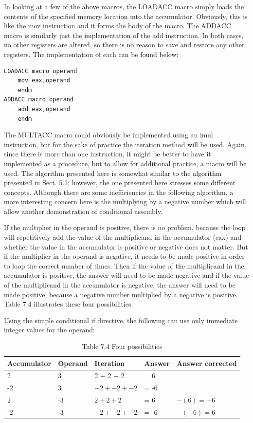 \documentclass[10pt]{article}
\begin{document}
In looking at a few of the above macros, the LOADACC macro simply loads the contents of the specified memory location into the accumulator. Obviously, this is like the mov instruction and it forms the body of the macro. The ADDACC macro is similarly just the implementation of the add instruction. In both cases, no other registers are altered, so there is no reason to save and restore any other registers. The implementation of each can be found below:

\begin{verbatim}
LOADACC macro operand
    mov eax,operand
    endm
ADDACC macro operand
    add eax,operand
    endm
\end{verbatim}

The MULTACC macro could obviously be implemented using an imul instruction, but for the sake of practice the iteration method will be used. Again, since there is more than one instruction, it might be better to have it implemented as a procedure, but to allow for additional practice, a macro will be used. The algorithm presented here is somewhat similar to the algorithm presented in Sect. 5.1; however, the one presented here stresses some different concepts. Although there are some inefficiencies in the following algorithm, a more interesting concern here is the multiplying by a negative number which will allow another demonstration of conditional assembly.

If the multiplier in the operand is positive, there is no problem, because the loop will repetitively add the value of the multiplicand in the accumulator (eax) and whether the value in the accumulator is positive or negative does not matter. But if the multiplier in the operand is negative, it needs to be made positive in order to loop the correct number of times. Then if the value of the multiplicand in the accumulator is positive, the answer will need to be made negative and if the value of the multiplicand in the accumulator is negative, the answer will need to be made positive, because a negative number multiplied by a negative is positive. Table 7.4 illustrates these four possibilities.

Using the simple conditional if directive, the following can use only immediate integer values for the operand:

\begin{table}[h]
\begin{center}
\captionsetup{labelformat=empty}
\caption{Table 7.4 Four possibilities}
\begin{tabular}{|l|l|l|l|l|}
\hline
Accumulator & Operand & Iteration & Answer & Answer corrected \\
\hline
2 & 3 & 2 + 2 + 2 & = 6 &  \\
\hline
-2 & 3 & $-2+-2+-2$ & = -6 &  \\
\hline
2 & -3 & $2+2+2$ & = 6 & $-(6)=-6$ \\
\hline
-2 & -3 & $-2+-2+-2$ & = -6 & $-(-6)=6$ \\
\hline
\end{tabular}
\end{center}
\end{table}
\end{document}
